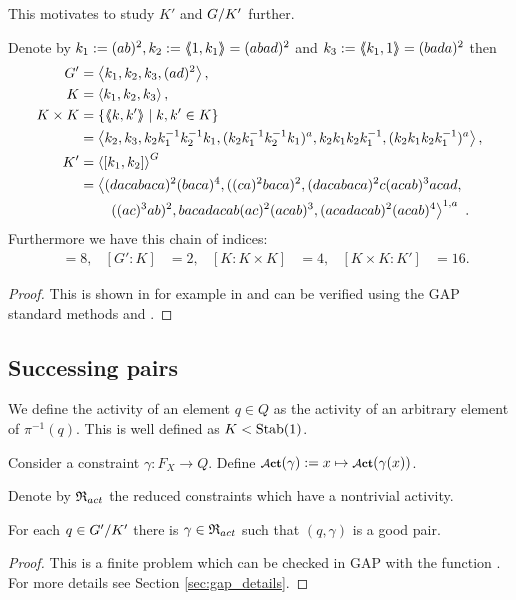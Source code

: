 \documentclass[a4paper,11pt]{amsart}
\begin{document}
This motivates to study $K'$ and ${G/K'}$ further.
\begin{lem} \label{lem:subgroupsOfG}
Denote by $k_1 := (ab)^2, k_2:=\langle\negthickspace\langle1,k_1\rangle\negthickspace\rangle = (abad)^2$ and $k_3:=\langle\negthickspace\langle k_1,1\rangle\negthickspace\rangle = (bada)^2$ then 
 \begin{align*}
  G' &= \left< k_1,k_2,k_3,(ad)^2\right>, \\
  K &= \left< k_1,k_2,k_3\right>, \\
  K\times K &= \{\langle\negthickspace\langle k,k'\rangle\negthickspace\rangle \mid k,k'\in K\} \\&= \left< k_2,k_3,k_2k_1^{-1}k_2^{-1}k_1,(k_2k_1^{-1}k_2^{-1}k_1)^a,k_2k_1k_2k_1^{-1},(k_2k_1k_2k_1^{-1})^a  \right>,\\
  K' &= \left< [k_1,k_2] \right>^G \\ 
  &= \left<(dacabaca)^2(baca)^4,((ca)^2baca)^2,(dacabaca)^2c(acab)^3acad,\right.\\
  &\qquad\left.((ac)^3ab)^2, bacadacab(ac)^2(acab)^3, (acadacab)^2(acab)^4\right>^{1,a}\ .
 \end{align*}
Furthermore we have this chain of indices:
\begin{align*}
  [G:G']&=8, & [G':K]&=2, &[K:K\times K]&= 4, &[K\times K:K']&=16. 
\end{align*}
\end{lem}
\begin{proof}
 This is shown in for example in \cite{Bartholdi:BranchGroups} and can be verified using the GAP standard methods
  and . 
\end{proof}

\subsection{Successing pairs}
\begin{defi}
 We define the activity of an element $q\in Q$ as the activity of an arbitrary element of $\pi^{-1}(q)$. 
 This is well defined as $K<\textup{Stab}(1)$. 
 
 Consider a constraint $\gamma\colon F_X \to Q$. 
 Define $\act(\gamma):= x \mapsto \act(\gamma(x))$.
 
 Denote by $\mathfrak{R}_{act}$ the reduced constraints which have a nontrivial activity.
\end{defi}

\begin{lem} \label{lem:existsGoodGamma}
 For each $q\in{G'/K'}$ there is $\gamma\in \mathfrak{R}_{act}$ such that $(q,\gamma)$ is a 
 good pair.
\end{lem}
\begin{proof}
 This is a finite problem which can be checked in GAP with the function .
 For more details see Section \ref{sec:gap_details}.
\end{proof}
\end{document}
